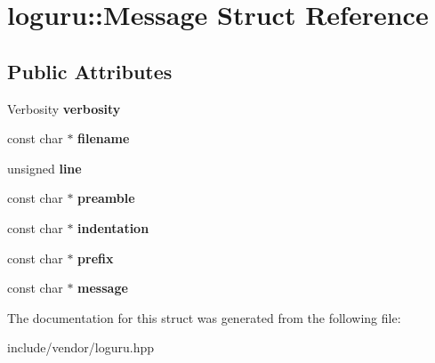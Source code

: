 \hypertarget{structloguru_1_1_message}{}\section{loguru\+:\+:Message Struct Reference}
\label{structloguru_1_1_message}
\subsection*{Public Attributes}
\begin{DoxyCompactItemize}
\item 
\mbox{\label{structloguru_1_1_message_a6c7db321cf6f149180d210a6ca197136}} 
Verbosity {\bfseries verbosity}
\item 
\mbox{\label{structloguru_1_1_message_a4e0b82a977a3a7ce4d4c812b0523f0b7}} 
const char $\ast$ {\bfseries filename}
\item 
\mbox{\label{structloguru_1_1_message_a7a2f455ae8d4584ec5c0972bd7e29176}} 
unsigned {\bfseries line}
\item 
\mbox{\label{structloguru_1_1_message_a9bf71a52f140adc7625ff3024f5a15fc}} 
const char $\ast$ {\bfseries preamble}
\item 
\mbox{\label{structloguru_1_1_message_aa9e01a5de257663fdf80925479f0529d}} 
const char $\ast$ {\bfseries indentation}
\item 
\mbox{\label{structloguru_1_1_message_afd461d2d71e2df2289a6119571eb233c}} 
const char $\ast$ {\bfseries prefix}
\item 
\mbox{\label{structloguru_1_1_message_a23ad5394fd8af40df9adb888fec5f477}} 
const char $\ast$ {\bfseries message}
\end{DoxyCompactItemize}


The documentation for this struct was generated from the following file\+:\begin{DoxyCompactItemize}
\item 
include/vendor/loguru.\+hpp\end{DoxyCompactItemize}
